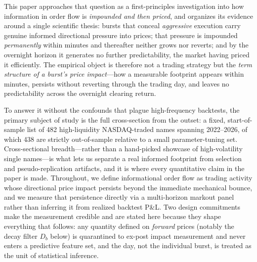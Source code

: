 \documentclass[11pt]{article}
\begin{document}
This paper approaches that question as a first-principles investigation into how information in order flow is \emph{impounded and then priced}, and organizes its evidence around a single scientific thesis: bursts that conceal \emph{aggressive} execution carry genuine informed directional pressure into prices; that pressure is impounded \emph{permanently} within minutes and thereafter neither grows nor reverts; and by the overnight horizon it generates no further predictability, the market having priced it efficiently. The empirical object is therefore not a trading strategy but the \emph{term structure of a burst's price impact}---how a measurable footprint appears within minutes, persists without reverting through the trading day, and leaves no predictability across the overnight clearing return.

To answer it without the confounds that plague high-frequency backtests, the primary subject of study is the full cross-section from the outset: a fixed, start-of-sample list of 482 high-liquidity NASDAQ-traded names spanning 2022--2026, of which 438 are strictly out-of-sample relative to a small parameter-tuning set. Cross-sectional breadth---rather than a hand-picked showcase of high-volatility single names---is what lets us separate a real informed footprint from selection and pseudo-replication artifacts, and it is where every quantitative claim in the paper is made. Throughout, we define informational order flow as trading activity whose directional price impact persists beyond the immediate mechanical bounce, and we measure that persistence directly via a multi-horizon markout panel rather than inferring it from realized backtest P\&L. Two design commitments make the measurement credible and are stated here because they shape everything that follows: any quantity defined on \emph{forward} prices (notably the decay filter $D_b$ below) is quarantined to ex-post impact measurement and never enters a predictive feature set, and the day, not the individual burst, is treated as the unit of statistical inference.
\end{document}
